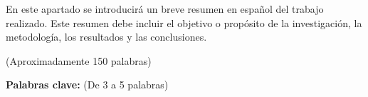 
En este apartado se introducirá un breve resumen en español del trabajo realizado. Este resumen debe incluir el objetivo o propósito de la investigación, la metodología, los resultados y las conclusiones.

(Aproximadamente 150 palabras)

\textbf{Palabras clave:} (De 3 a 5 palabras)
\newpage
